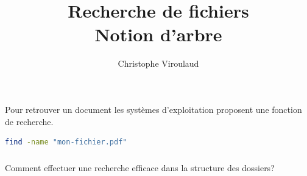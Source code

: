 \documentclass[svgnames,11pt]{beamer}
\author[]{Christophe Viroulaud}
\title{Recherche de fichiers\\Notion d'arbre}
\date{\framebox{\textbf{Algo 04}}}
\institute{Terminale - NSI}
\begin{document}
\begin{frame}
    \titlepage
\end{frame}
\begin{frame}[fragile]
    \frametitle{}

    Pour retrouver un document les systèmes d'exploitation proposent une fonction de recherche.
    \begin{center}
        \begin{lstlisting}[language=bash , basicstyle=\ttfamily\small, xleftmargin=2em, xrightmargin=2em]
find -name "mon-fichier.pdf"   
\end{lstlisting}
        \label{CODE}
    \end{center}

\end{frame}
\begin{frame}
    \frametitle{}

    \begin{framed}
        Comment effectuer une recherche efficace dans la structure des dossiers?
    \end{framed}

\end{frame}
\end{document}
